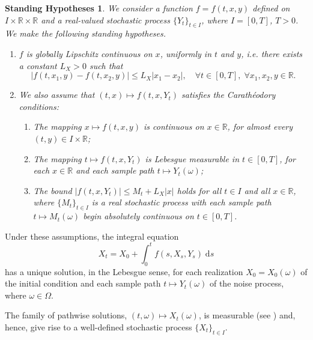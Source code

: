 \documentclass[reqno,12pt]{amsart}
\theoremstyle{plain}%
\newtheorem{stdhyp}{Standing Hypotheses}[section]
\theoremstyle{definition}
\begin{document}
\begin{stdhyp}
    \label{standinghypotheses}
    We consider a function $f=f(t, x, y)$ defined on $I\times \mathbb{R}\times\mathbb{R}$ and a real-valued stochastic process $\{Y_t\}_{t\in I}$, where $I=[0, T]$, $T > 0$. We make the following standing hypotheses.
    \begin{enumerate}
        \item $f$ is globally Lipschitz continuous on $x$, uniformly in $t$ and $y$, i.e. there exists a constant $L_X > 0$ such that
            \begin{equation}
                \label{Lxassumptionbasic}
                |f(t, x_1, y) - f(t, x_2, y)| \leq L_X |x_1 - x_2|, \quad \forall t \in [0, T], \;\forall x_1, x_2, y\in\mathbb{R}.
            \end{equation}

        \item We also assume that $(t, x) \mapsto f(t, x, Y_t)$ satisfies the Carath\'eodory conditions:
            \begin{enumerate}
                \item The mapping $x \mapsto f(t, x, y)$ is continuous on $x\in \mathbb{R}$, for almost every $(t, y)\in I\times \mathbb{R}$;
                \item The mapping $t \mapsto f(t, x, Y_t)$ is Lebesgue measurable in $t\in [0, T]$, for each $x\in \mathbb{R}$ and each sample path $t \mapsto Y_t(\omega)$;
                \item The bound $|f(t, x, Y_t)| \leq M_t + L_X|x|$ holds for all $t\in I$ and all $x\in\mathbb{R}$, where $\{M_t\}_{t\in I}$ is a real stochastic process with each sample path $t\mapsto M_t(\omega)$ begin absolutely continuous on $t\in [0, T]$.
            \end{enumerate}
    \end{enumerate}
\end{stdhyp}

Under these assumptions, the integral equation
\begin{equation}
    \label{integralrodeform}
    X_t = X_0 + \int_0^t f(s, X_s, Y_s) \;\mathrm{d}s
\end{equation}
has a unique solution, in the Lebesgue sense, for each realization $X_0 = X_0(\omega)$ of the initial condition and each sample path $t\mapsto Y_t(\omega)$ of the noise process, where $\omega\in \Omega$.

The family of pathwise solutions, $(t, \omega) \mapsto X_t(\omega)$, is measurable (see \cite[Section 2.1.2]{HanKloeden2017}) and, hence, give rise to a well-defined stochastic process $\{X_t\}_{t\in I}$.
\end{document}
